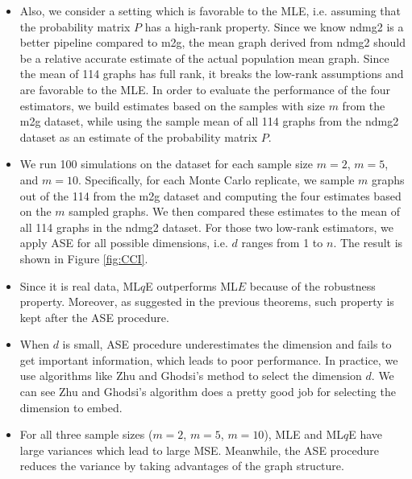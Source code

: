 \documentclass[a4paper]{article}
\begin{document}
\begin{itemize}
\item Also, we consider a setting which is favorable to the MLE, i.e. assuming that the probability matrix $P$ has a high-rank property. Since we know ndmg2 is a better pipeline compared to m2g, the mean graph derived from ndmg2 should be a relative accurate estimate of the actual population mean graph. Since the mean of 114 graphs has full rank, it breaks the low-rank assumptions and are favorable to the MLE.
In order to evaluate the performance of the four estimators, we build estimates based on the samples with size $m$ from the m2g dataset, while using the sample mean of all 114 graphs from the ndmg2 dataset as an estimate of the probability matrix $P$.
\item We run 100 simulations on the dataset for each sample size $m = 2$, $m = 5$, and $m = 10$.
Specifically, for each Monte Carlo replicate, we sample $m$ graphs out of the 114 from the m2g dataset and computing the four estimates based on the $m$ sampled graphs. We then compared these estimates to the mean of all 114 graphs in the ndmg2 dataset.
For those two low-rank estimators, we apply ASE for all possible dimensions, i.e. $d$ ranges from 1 to $n$. The result is shown in Figure \ref{fig:CCI}.
\item Since it is real data, ML$q$E outperforms ML$E$ because of the robustness property. Moreover, as suggested in the previous theorems, such property is kept after the ASE procedure.
\item When $d$ is small, ASE procedure underestimates the dimension and fails to get important information, which leads to poor performance. In practice, we use algorithms like Zhu and Ghodsi's method to select the dimension $d$. We can see Zhu and Ghodsi's algorithm does a pretty good job for selecting the dimension to embed.
\item For all three sample sizes ($m = 2$, $m = 5$, $m = 10$), MLE and ML$q$E have large variances which lead to large MSE. Meanwhile, the ASE procedure reduces the variance by taking advantages of the graph structure.
\end{itemize}
\end{document}
